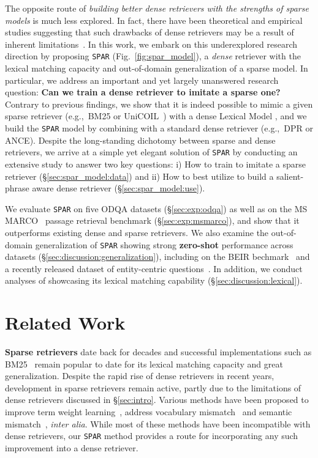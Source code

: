 \documentclass[11pt]{article}
\newcommand{\spar}{\texttt{SPAR}\xspace}
\newcommand{\lexmodel}{Lexical Model}
\newcommand{\lexmodelsymbol}{\xspace}
\newcommand{\secref}[1]{\S\ref{#1}}
\begin{document}
The opposite route of \emph{building better dense retrievers with the strengths of sparse models} is much less explored.
In fact, there have been theoretical and empirical studies suggesting that such drawbacks of dense retrievers may be a result of inherent limitations~\cite{luan-etal-2021-sparse,reimers-gurevych-2021-curse}.
In this work, we embark on this underexplored research direction by proposing \spar{} (Fig.~\ref{fig:spar_model}), a \emph{dense} retriever with the lexical matching capacity and out-of-domain generalization of a sparse model.
In particular, we address an important and yet largely unanswered research question: \textbf{Can we train a dense retriever to imitate a sparse one?}
Contrary to previous findings, we show that it is indeed possible to mimic a given sparse retriever (e.g.,~BM25 or UniCOIL~\cite{lin2021brief}) with a dense \lexmodel{} \lexmodelsymbol{}, and we build the \spar{} model by combining \lexmodelsymbol{} with a standard dense retriever (e.g.,~DPR or ANCE).
Despite the long-standing dichotomy between sparse and dense retrievers, we arrive at a simple yet elegant solution of \spar{} by conducting an extensive study to answer two key questions: i) How to train \lexmodelsymbol{} to imitate a sparse retriever (\secref{sec:spar_model:data}) and ii) How to best utilize \lexmodelsymbol{} to build a salient-phrase aware dense retriever (\secref{sec:spar_model:use}).

We evaluate \spar{} on five ODQA datasets (\secref{sec:exp:odqa}) as well as on the MS MARCO~\cite{bajaj2018ms} passage retrieval benchmark (\secref{sec:exp:msmarco}), and show that it outperforms existing dense and sparse retrievers.
We also examine the out-of-domain generalization of \spar{} showing strong \textbf{zero-shot} performance across datasets (\secref{sec:discussion:generalization}), including on the BEIR bechmark~\cite{thakur2021beir} and a recently released dataset of entity-centric questions~\cite{sciavolino2021simple}.
In addition, we conduct analyses of \lexmodelsymbol{} showcasing its lexical matching capability (\secref{sec:discussion:lexical}).
 
\section{Related Work}\label{sec:relatedwork}

\noindent\textbf{Sparse retrievers} date back for decades and successful implementations such as BM25~\cite{bm25} remain popular to date for its lexical matching capacity and great generalization.
Despite the rapid rise of dense retrievers in recent years, development in sparse retrievers remain active, partly due to the limitations of dense retrievers discussed in \secref{sec:intro}.
Various methods have been proposed to improve term weight learning~\cite{deepct,deepimpact}, address vocabulary mismatch~\cite{doctttttquery} and semantic mismatch~\cite{gao-etal-2021-coil}, \emph{inter alia}.
While most of these methods have been incompatible with dense retrievers, our \spar{} method provides a route for incorporating any such improvement into a dense retriever.
\end{document}
